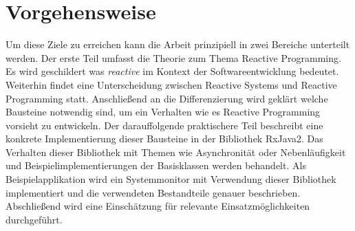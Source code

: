 \section{Vorgehensweise}
Um diese Ziele zu erreichen kann die Arbeit prinzipiell in zwei Bereiche unterteilt werden. Der erste Teil umfasst die Theorie zum Thema Reactive Programming. Es wird geschildert was \textit{reactive} im Kontext der Softwareentwicklung bedeutet. Weiterhin findet eine Unterscheidung zwischen Reactive Systems und Reactive Programming statt. Anschließend an die Differenzierung wird geklärt welche Bausteine notwendig sind, um ein Verhalten wie es Reactive Programming vorsieht zu entwickeln. Der darauffolgende praktischere Teil beschreibt eine konkrete Implementierung dieser Bausteine in der Bibliothek RxJava2. Das Verhalten dieser Bibliothek mit Themen wie Asynchronität oder Nebenläufigkeit und Beispielimplementierungen der Basisklassen werden behandelt. Als Beispielapplikation wird ein Systemmonitor mit Verwendung dieser Bibliothek implementiert und die verwendeten Bestandteile genauer beschrieben. Abschließend wird eine Einschätzung für relevante Einsatzmöglichkeiten durchgeführt.
